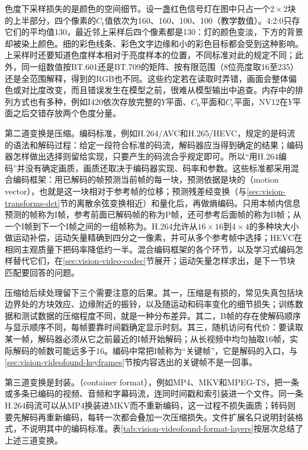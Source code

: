 色度下采样损失的是颜色的空间细节。设一盏红色信号灯在图中只占一个$2\times2$块的上半部分，四个像素的$C_{\mathrm r}$值依次为160、160、100、100（教学数值）。4:2:0只存它们的平均值130，最近邻上采样后四个像素都是130：灯的颜色变淡，下方的背景却被染上颜色。细的彩色线条、彩色文字边缘和小的彩色目标都会受到这种影响。上采样时还要知道色度样本相对于亮度样本的位置，不同标准对此的规定不同；此外，同一组数值按BT.601还是BT.709的矩阵、按有限范围（8位亮度取16至235）还是全范围解释，得到的RGB也不同。这些约定若在读取时弄错，画面会整体偏色或对比度改变，而且错误发生在模型之前，很难从模型输出中追查。内存中的排列方式也有多种，例如I420依次存放完整的$Y$平面、$C_{\mathrm b}$平面和$C_{\mathrm r}$平面，NV12在$Y$平面之后交错存放两个色度分量。

第二道变换是压缩。编码标准，例如H.264/AVC和H.265/HEVC，规定的是码流的语法和解码过程：给定一段符合标准的码流，解码器应当得到确定的结果；编码器怎样做出选择则留给实现，只要产生的码流合乎规定即可。所以“用H.264编码”并没有确定画质，画质还取决于编码器实现、码率和参数。这些标准都采用混合编码框架：用已解码的帧预测当前帧的每一块，预测依据是块的（motion vector），也就是这一块相对于参考帧的位移；预测残差经变换（与\ref{sec:vision-transforms-dct}节的离散余弦变换相近）和量化后，再做熵编码。只用本帧内信息预测的帧称为I帧，参考前面已解码帧的称为P帧，还可参考后面帧的称为B帧；从一个I帧到下一个I帧之间的一组帧称为。H.264允许从$16\times16$到$4\times4$的多种块大小做运动补偿，运动矢量精确到四分之一像素，并可从多个参考帧中选择；HEVC在相同主观质量下把码率降低约一半。混合编码框架的各个环节，以及学习式编码怎样替代它们，在\ref{sec:vision-video-codec}节展开；运动矢量怎样求出，是下一节块匹配要回答的问题。

压缩给后续处理留下三个需要注意的后果。其一，压缩是有损的，常见失真包括块边界处的方块效应、边缘附近的振铃，以及随运动和码率变化的细节损失；训练数据和测试数据的压缩程度不同，就是一种分布差异。其二，B帧的存在使解码顺序与显示顺序不同，每帧要靠时间戳确定显示时刻。其三，随机访问有代价：要读取某一帧，解码器必须从它之前最近的I帧开始解码；从长视频中均匀抽取16帧，实际解码的帧数可能远多于16。编码中常把I帧称为“关键帧”，它是解码的入口，与\ref{sec:vision-videofound-keyframes}节按内容选出的关键帧不是一回事。

第三道变换是封装。（container format），例如MP4、MKV和MPEG-TS，把一条或多条已编码的视频、音频和字幕码流，连同时间戳和索引装进一个文件。同一条H.264码流可以从MP4换装进MKV而不重新编码，这一过程不损失画质；转码则要先解码再重新编码，每转一次都会叠加一次压缩损失。文件扩展名只说明封装格式，不说明其中的编码标准。表\ref{tab:vision-videofound-format-layers}按层次总结了上述三道变换。

